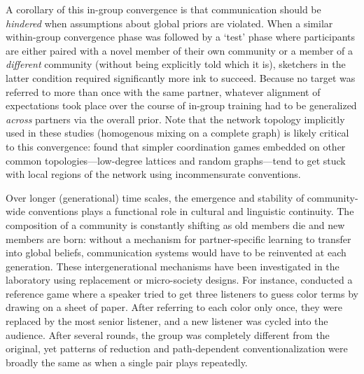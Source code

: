 \documentclass[11pt, floatsintext, jou]{apa6}
\begin{document}
A corollary of this in-group convergence is that communication should be \emph{hindered} when assumptions about global priors are violated. When a similar within-group convergence phase was followed by a `test' phase where participants are either paired with a novel member of their own community or a member of a \emph{different} community (without being explicitly told which it is), sketchers in the latter condition required significantly more ink to succeed. %
Because no target was referred to more than once with the same partner, whatever alignment of expectations took place over the course of in-group training had to be generalized \emph{across} partners via the overall prior. Note that the network topology implicitly used in these studies (homogenous mixing on a complete graph) is likely critical to this convergence:  found that  simpler coordination games embedded on other common topologies---low-degree lattices and random graphs---tend to get stuck with local regions of the network using incommensurate conventions. 

Over longer (generational) time scales, the emergence and stability of community-wide conventions plays a functional role in cultural and linguistic continuity. The composition of a community is constantly shifting as old members die and new members are born: without a mechanism for partner-specific learning to transfer into global beliefs, communication systems would have to be reinvented at each generation. These intergenerational mechanisms have been investigated in the laboratory using replacement or micro-society designs.%
For instance,  conducted a reference game where a speaker tried to get three listeners to guess color terms by drawing on a sheet of paper. After referring to each color only once, they were replaced by the most senior listener, and a new listener was cycled into the audience. After several rounds, the group was completely different from the original, yet patterns of reduction and path-dependent conventionalization were broadly the same as when a single pair plays repeatedly. 
\end{document}
